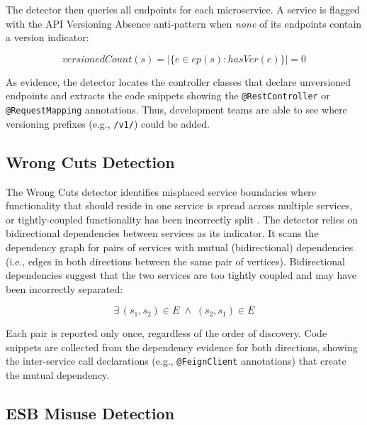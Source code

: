 The detector then queries all endpoints for each microservice. A service is flagged with the API Versioning Absence anti-pattern when \textit{none} of its endpoints contain a version indicator:

\begin{equation}
    \mathit{versionedCount}(s) = \bigl|\{e \in \mathit{ep}(s) : \mathit{hasVer}(e)\}\bigr| = 0
    \label{eq:api-versioning-detection}
\end{equation}

As evidence, the detector locates the controller classes that declare unversioned endpoints and extracts the code snippets showing the \texttt{@RestController} or \texttt{@Re\-questMap\-ping} annotations. Thus, development teams are able to see where versioning prefixes (e.g., \texttt{/v1/}) could be added.

\subsection{Wrong Cuts Detection}
\label{subsec:detect-wrong-cuts}

\par The Wrong Cuts detector identifies misplaced service boundaries where functionality that should reside in one service is spread across multiple services, or tightly-coupled functionality has been incorrectly split \cite{Taibi2018}. The detector relies on bidirectional dependencies between services as its indicator. It scans the dependency graph for pairs of services with mutual (bidirectional) dependencies (i.e., edges in both directions between the same pair of vertices). Bidirectional dependencies suggest that the two services are too tightly coupled and may have been incorrectly separated:

\begin{equation}
    \exists\, (s_1, s_2) \in E \;\wedge\; (s_2, s_1) \in E
    \label{eq:wrong-cuts-bidir}
\end{equation}

Each pair is reported only once, regardless of the order of discovery. Code snippets are collected from the dependency evidence for both directions, showing the inter-service call declarations (e.g., \texttt{@FeignClient} annotations) that create the mutual dependency.

\subsection{ESB Misuse Detection}
\label{subsec:detect-esb-misuse}

